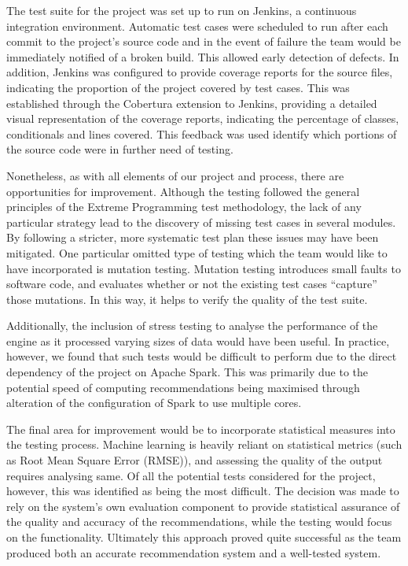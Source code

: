 \documentclass{l3proj}
\begin{document}
The test suite for the project was set up to run on Jenkins, a continuous integration environment. Automatic test cases were scheduled to run after each commit to the project's source code and in the event of failure the team would be immediately notified of a broken build. This allowed early detection of defects. In addition, Jenkins was configured to provide coverage reports for the source files, indicating the proportion of the project covered by test cases. This was established through the Cobertura extension to Jenkins,  providing a detailed visual representation of the coverage reports, indicating the percentage of classes, conditionals and lines covered. This feedback was used identify which portions of the source code were in further need of testing.

Nonetheless, as with all elements of our project and process, there are opportunities for improvement. Although the testing followed the general principles of the Extreme Programming test methodology, the lack of any particular strategy lead to the discovery of missing test cases in several modules. By following a stricter, more systematic test plan these issues may have been mitigated. One particular omitted type of testing which the team would like to have incorporated is mutation testing. Mutation testing introduces small faults to software code, and evaluates whether or not the existing test cases “capture” those mutations. In this way, it helps to verify the quality of the test suite.

Additionally, the inclusion of stress testing to analyse the performance of the engine as it processed varying sizes of data would have been useful. In practice, however, we found that such tests would be difficult to perform due to the direct dependency of the project on Apache Spark. This was primarily due to the potential speed of computing recommendations being maximised through alteration of the configuration of Spark to use multiple cores.  

The final area for improvement would be to incorporate statistical measures into the testing process. Machine learning is heavily reliant on statistical metrics (such as Root Mean Square Error (RMSE)), and assessing the quality of the output requires analysing same. Of all the potential tests considered for the project, however, this was identified as being the most difficult. The decision was made to rely on the system’s own evaluation component to provide statistical assurance of the quality and accuracy of the recommendations, while the testing would focus on the functionality. Ultimately this approach proved quite successful as the team produced both an accurate recommendation system and a well-tested system.
\end{document}
